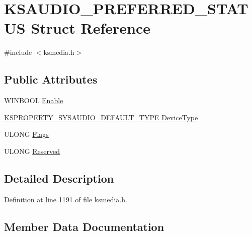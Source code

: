 \hypertarget{struct_k_s_a_u_d_i_o___p_r_e_f_e_r_r_e_d___s_t_a_t_u_s}{}\section{K\+S\+A\+U\+D\+I\+O\+\_\+\+P\+R\+E\+F\+E\+R\+R\+E\+D\+\_\+\+S\+T\+A\+T\+US Struct Reference}
\label{struct_k_s_a_u_d_i_o___p_r_e_f_e_r_r_e_d___s_t_a_t_u_s}


{\ttfamily \#include $<$ksmedia.\+h$>$}

\subsection*{Public Attributes}
\begin{DoxyCompactItemize}
\item 
W\+I\+N\+B\+O\+OL \hyperlink{struct_k_s_a_u_d_i_o___p_r_e_f_e_r_r_e_d___s_t_a_t_u_s_a191f968e80d543b357a666ea457ba491}{Enable}
\item 
\hyperlink{ksmedia_8h_ac77133e8cd3ff87d974725f70e1919e6}{K\+S\+P\+R\+O\+P\+E\+R\+T\+Y\+\_\+\+S\+Y\+S\+A\+U\+D\+I\+O\+\_\+\+D\+E\+F\+A\+U\+L\+T\+\_\+\+T\+Y\+PE} \hyperlink{struct_k_s_a_u_d_i_o___p_r_e_f_e_r_r_e_d___s_t_a_t_u_s_aad808725ceafbd1588499d1ebd16a953}{Device\+Type}
\item 
U\+L\+O\+NG \hyperlink{struct_k_s_a_u_d_i_o___p_r_e_f_e_r_r_e_d___s_t_a_t_u_s_a51f37479f079de3d781a3f278db8f553}{Flags}
\item 
U\+L\+O\+NG \hyperlink{struct_k_s_a_u_d_i_o___p_r_e_f_e_r_r_e_d___s_t_a_t_u_s_af2287d582962f1617285ddc6daaa0885}{Reserved}
\end{DoxyCompactItemize}


\subsection{Detailed Description}


Definition at line 1191 of file ksmedia.\+h.



\subsection{Member Data Documentation}
